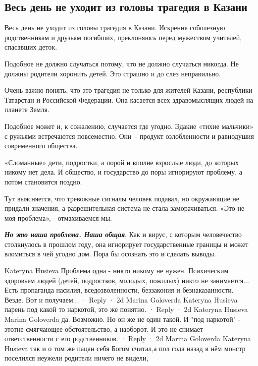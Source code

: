  
 
 
 
 
\subsection{Весь день не уходит из головы трагедия в Казани}

Весь день не уходит из головы трагедия в Казани. Искренне соболезную
родственникам и друзьям погибших, преклоняюсь перед мужеством учителей,
спасавших деток.

Подобное не должно случаться потому, что не должно случаться никогда. Не должны
родители хоронить детей. Это страшно и до слез неправильно.

Очень важно понять, что это трагедия не только для жителей Казани, республики
Татарстан и Российской Федерации. Она касается всех здравомыслящих людей на
планете Земля.

Подобное может и, к сожалению, случается где угодно. Эдакие «тихие мальчики» с
ружьями встречаются повсеместно. Они – продукт озлобленности и равнодушия
современного общества.

«Сломанные» дети, подростки, а порой и вполне взрослые люди, до которых никому
нет дела. И общество, и государство до поры игнорируют проблему, а потом
становится поздно.

Тут выясняется, что тревожные сигналы человек подавал, но окружающие не придали
значения, а разрешительная система не стала заморачиваться. «Это не моя
проблема», - отмахиваемся мы.

\textbf{\emph{Но это наша проблема. Наша общая}}. Как и вирус, с которым человечество
столкнулось в прошлом году, она игнорирует государственные границы и может
вломиться в чей угодно дом. Пора бы осознать это и сделать выводы.

Kateryna Husieva
Проблема одна - никто никому не нужен. Психическим здоровьем людей (детей, подростков, молодых, пожилых) никто не занимается... Есть пропаганда насилия, вседозволенности, беззакония и безнаказанности. Везде. Вот и получаем...
 · Reply · 2d
Marina Goloverda
Kateryna Husieva парень под какой то наркотой, это же понятно.
 · Reply · 2d
Kateryna Husieva
Marina Goloverda да. Возможно. Но он же не один такой. И "под наркотой" - этотне смягчающее обстоятельство, а наоборот. И это не снимает ответственности с его родственников.
 · Reply · 2d
Marina Goloverda
Kateryna Husieva так и о том же пацан себя Богом считал,а пол года назад в нём монстр поселился неужели родители ничего не видели,

